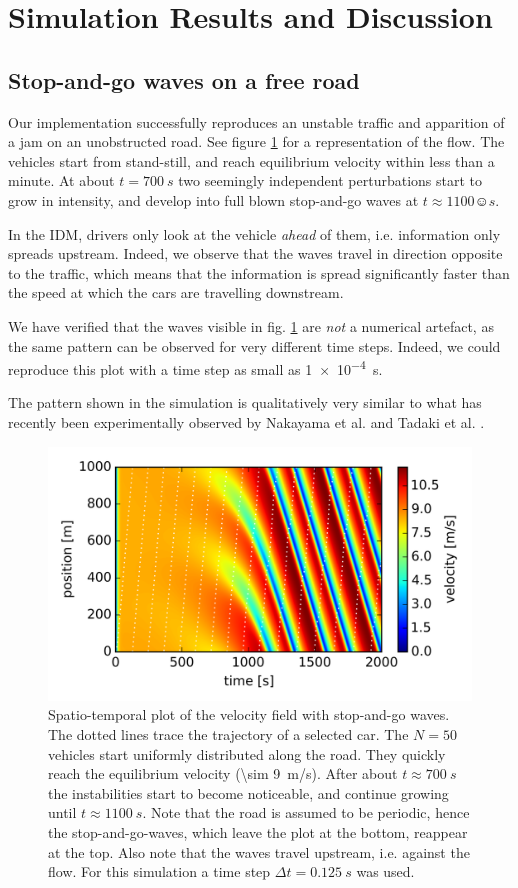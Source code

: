 \section{Simulation Results and Discussion}
\subsection{Stop-and-go waves on a free road}
Our implementation successfully reproduces an unstable traffic and apparition of a jam on an unobstructed road. See figure \ref{fig:free_road} for a representation of the flow. The vehicles start from stand-still, and reach equilibrium velocity within less than a minute. At about $t=\SI{700}{s}$ two seemingly independent perturbations start to grow in intensity, and develop into full blown stop-and-go waves at $t\approx \SI{1100}☺{s}$.

In the IDM, drivers only look at the vehicle \emph{ahead} of them, i.e. information only spreads upstream. Indeed, we observe that the waves travel in direction opposite to the traffic, which means that the information is spread significantly faster than the speed at which the cars are travelling downstream.

We have verified that the waves visible in fig. \ref{fig:free_road} are \emph{not} a numerical artefact, as the same pattern can be observed for very different time steps. Indeed, we could reproduce this plot with a time step as small as \SI{1e-4}{s}.

The pattern shown in the simulation is qualitatively very similar to what has recently been experimentally observed by Nakayama et al. \cite{nakayama2009} and Tadaki et al. \cite{tadaki2013}.
\begin{figure}
    \centering
    \includegraphics[width=5in]{../img/free_road.png}
    \caption{Spatio-temporal plot of the velocity field with stop-and-go waves. The dotted lines trace the trajectory of a selected car. The $N=50$ vehicles start uniformly distributed along the road. They quickly reach the equilibrium velocity (\SI{\sim 9}{m/s}). After about $t\approx\SI{700}{s}$ the instabilities start to become noticeable, and continue growing until $t\approx \SI{1100}{s}$. Note that the road is assumed to be periodic, hence the stop-and-go-waves, which leave the plot at the bottom, reappear at the top. Also note that the waves travel upstream, i.e. against the flow. For this simulation a time step $\Delta t=\SI{0.125}{s}$ was used.}
    \label{fig:free_road}
\end{figure}
\newpage
